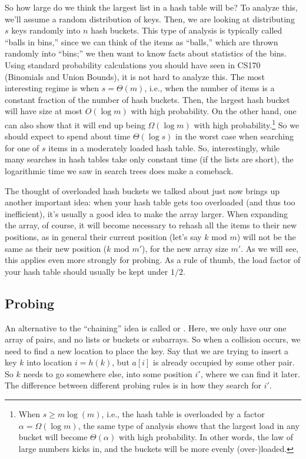 So how large do we think the largest list in a hash table will be?
To analyze this, we'll assume a random distribution of keys. 
Then, we are looking at distributing $s$ keys randomly into $n$ hash
buckets. This type of analysis is typically called ``balls in bins,''
since we can think of the items as ``balls,'' which are thrown
randomly into ``bins;'' we then want to know facts about statistics of
the bins. Using standard probability calculations you should have seen
in CS170 (Binomials and Union Bounds), it is not hard to analyze this.
The most interesting regime is when $s = \Theta(m)$, i.e., when the
number of items is a constant fraction of the number of hash buckets. 
Then, the largest hash bucket will have size at most $O(\log m)$ with
high probability. On the other hand, one can also show that it will
end up being $\Omega(\log m)$ with high probability.\footnote{When $s
  \geq m \log(m)$, i.e., the hash table is overloaded by a factor
  $\alpha = \Omega(\log m)$, the same type of analysis shows that
  the largest load in any bucket will become $\Theta(\alpha)$ with
  high probability. In other words, the law of large numbers kicks in,
  and the buckets will be more evenly (over-)loaded.}
So we should expect to spend about time $\Theta(\log s)$ in the worst
case when searching for one of $s$ items in a moderately loaded hash
table. So, interestingly, while many searches in hash tables take only
constant time (if the lists are short), the logarithmic time we saw in
search trees does make a comeback.

The thought of overloaded hash buckets we talked about just now brings
up another important idea: when your hash table gets too overloaded
(and thus too inefficient), it's usually a good idea to make the array
larger. When expanding the array, of course, it will become necessary
to rehash all the items to their new positions, as in general their
current position (let's say $k \text{ mod } m$) will not be the same
as their new position ($k \text{ mod } m'$), for the new array size $m'$.
As we will see, this applies even more strongly for probing.
As a rule of thumb, the load factor of your hash table should usually
be kept under $1/2$.

\subsection{Probing}
An alternative to the ``chaining'' idea is called  or
. Here, we only have our one array  of
pairs, and no lists or buckets or subarrays. So when a collision
occurs, we need to find a new location to place the key.
Say that we are trying to insert a key $k$ into location $i = h(k)$,
but $a[i]$ is already occupied by some other pair.
So $k$ needs to go somewhere else, into some position $i'$, where we
can find it later.
The difference between different probing rules is in how they search
for $i'$.

